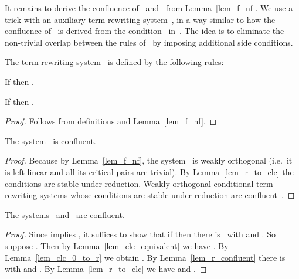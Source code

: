 \documentclass[a4paper,UKenglish]{lipics-v2016}
\begin{document}
It remains to derive the confluence of~ and~ from
Lemma~\ref{lem_f_nf}. We use a trick with an auxiliary term rewriting
system~, in a way similar to how the confluence of~ is
derived from the condition~
in~\cite{Vrijer1999}. The idea is to eliminate the non-trivial overlap
between the rules of~ by imposing additional side conditions.

\begin{definition}
  The term rewriting system~ is defined by the following rules:
  
\end{definition}

\begin{lemma}\label{lem_clc_0_to_r}
  If  then .
\end{lemma}

\begin{lemma}\label{lem_r_to_clc}
  If  then .
\end{lemma}

\begin{proof}
  Follows from definitions and Lemma~\ref{lem_f_nf}.
\end{proof}

\begin{lemma}\label{lem_r_confluent}
  The system~ is confluent.
\end{lemma}

\begin{proof}
  Because  by Lemma~\ref{lem_f_nf}, the system~
  is weakly orthogonal (i.e.~it is left-linear and all its critical
  pairs are trivial). By Lemma~\ref{lem_r_to_clc} the conditions are
  stable under reduction. Weakly orthogonal conditional term rewriting
  systems whose conditions are stable under reduction are
  confluent~\cite[Chapter 4]{Terese2003}.
\end{proof}

\begin{theorem}
  The systems~ and~ are confluent.
\end{theorem}

\begin{proof}
  Since  implies , it
  suffices to show that if  then there is~ with
   and . So suppose . Then by Lemma~\ref{lem_clc_equivalent} we have . By Lemma~\ref{lem_clc_0_to_r} we obtain . By Lemma~\ref{lem_r_confluent} there is~ with  and . By Lemma~\ref{lem_r_to_clc} we
  have  and .
\end{proof}

{}
\end{document}
